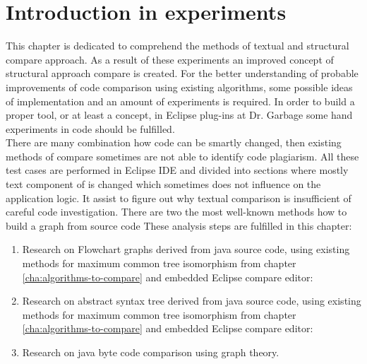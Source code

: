 \documentclass{report}
\begin{document}
\section{Introduction in experiments}

This chapter is dedicated to comprehend the methods of textual and structural compare approach. As a result of these experiments an improved concept of structural approach compare  is created. For the better understanding of probable improvements of code comparison using existing algorithms, some possible ideas of implementation and an amount of experiments is required. In order to build a proper tool, or at least a concept, in Eclipse plug-ins at Dr. Garbage some hand experiments in code should be fulfilled. 
\\
There are many combination how code can be smartly changed, then existing methods of compare sometimes are not able to identify code plagiarism.  All these test cases are performed in Eclipse IDE \cite{eclipse_site} and divided into sections where mostly text component of is changed which sometimes does not influence on the application logic. It assist to figure out why textual comparison is insufficient of careful code investigation. There are two the most well-known methods how to build a graph from source code  These analysis steps are fulfilled in this chapter:
\begin{enumerate}
  \item Research on Flowchart graphs derived from java source code, using existing methods for maximum common tree isomorphism from chapter \ref{cha:algorithms-to-compare} and embedded Eclipse compare editor:	
  
  \item Research on abstract syntax tree derived from java source code, using existing methods for maximum common tree isomorphism from chapter \ref{cha:algorithms-to-compare} and embedded Eclipse compare editor:	
  
  \item Research on java byte code comparison using graph theory.
\end{enumerate}
\end{document}
